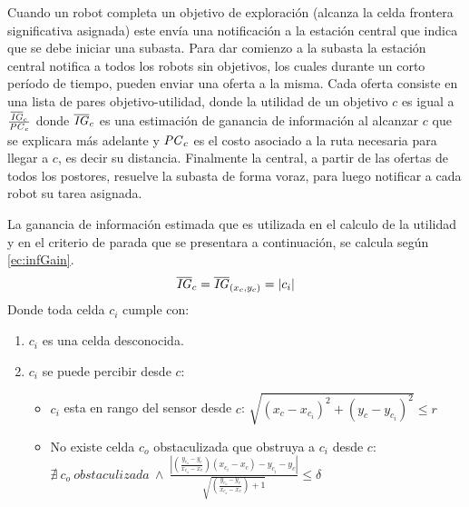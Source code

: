 Cuando un robot completa un objetivo de exploración (alcanza la celda frontera significativa asignada) este envía una notificación a la estación central que indica que se debe iniciar una subasta. Para dar comienzo a la subasta la estación central notifica a todos los robots sin objetivos, los cuales durante un corto período de tiempo, pueden enviar una oferta a la misma. Cada oferta consiste en una lista de pares objetivo-utilidad, donde la utilidad de un objetivo $c$ es igual a $\frac{\overline{\mathit{IG}}_c}{\mathit{PC}_c}$ donde $\overline{\mathit{IG}}_c$ es una estimación de ganancia de información al alcanzar $c$ que se explicara más adelante y $\mathit{PC}_c$ es el costo asociado a la ruta necesaria para llegar a $c$, es decir su distancia. Finalmente la central, a partir de las ofertas de todos los postores, resuelve la subasta de forma voraz, para luego notificar a cada robot su tarea asignada.


La ganancia de información estimada que es utilizada en el calculo de la utilidad y en el criterio de parada que se presentara a continuación, se calcula según \eqref{ec:infGain}. 
\begin{equation}\label{ec:infGain}
  \overline{\mathit{IG}}_c = \overline{\mathit{IG}}_{(x_c,y_c)} = |{c_i}|
\end{equation}
Donde toda celda $c_i$ cumple con:
\begin{enumerate}[label=(\roman*)]
  \item $c_i$ es una celda desconocida.
  \item $c_i$ se puede percibir desde $c$:
  \begin{itemize}
    \item $c_i$ esta en rango del sensor desde $c$: $\sqrt{(x_c - x_{c_i})^2 + (y_c - y_{c_i})^2}\leq r$
    \item No existe celda $c_o$ obstaculizada que obstruya a $c_i$ desde $c$:\\
      $\nexists\ c_o \ obstaculizada \ \land \ \frac{ |(\frac{y_{c_o}-y_c}{x_{c_o}-x_c})(x_{c_i}-x_c) - y_{c_i} - y_{c}| }{\sqrt{(\frac{y_{c_o}-y_c}{x_{c_o}-x_c})+1}}\leq \delta $
  \end{itemize}
\end{enumerate}

